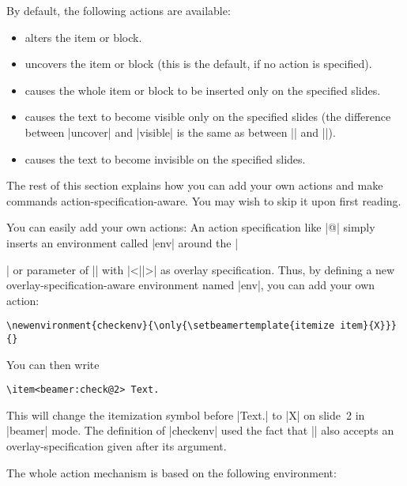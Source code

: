 By default, the following actions are available:
\begin{itemize}
\item {} alters the item or block.
\item {} uncovers the item or block (this is
  the default, if no action is specified).
\item {} causes the whole item or block
  to be inserted only on the specified slides.
\item {} causes the text to become visible only on
  the specified slides (the difference between |uncover| and
  |visible| is the same as between |\uncover| and |\visible|).
\item {} causes the text to become invisible on the
  specified slides.
\end{itemize}

The rest of this section explains how you can add your own actions and
make commands action-specification-aware. You may wish to skip it upon
first reading.

You can easily add your own actions: An action specification like
|@| simply inserts an environment
called |env| around the |\item| or parameter of
|\action| with |<||>| as overlay
specification. Thus, by defining a new overlay-specification-aware
environment named |env|, you can add your own
action:
\begin{verbatim}
\newenvironment{checkenv}{\only{\setbeamertemplate{itemize item}{X}}}{}
\end{verbatim}
You can then  write
\begin{verbatim}
\item<beamer:check@2> Text.
\end{verbatim}
This will change the itemization symbol before |Text.| to |X| on
slide~2 in |beamer| mode. The definition of |checkenv| used the fact
that |\only| also accepts an overlay-specification given after its
argument.

The whole action mechanism is based on the following environment:

